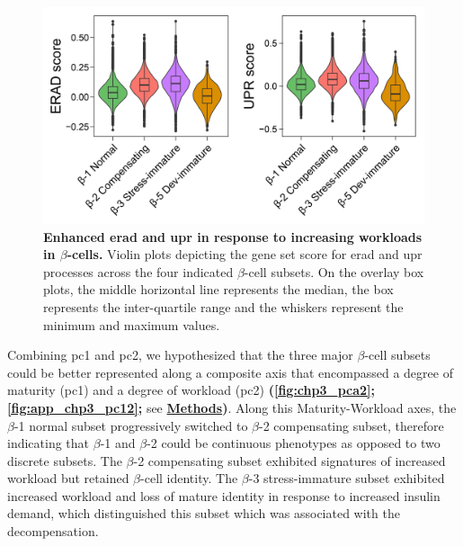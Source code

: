 \begin{figure}[t]
\centering
\includegraphics[width=\linewidth]{Chapter5/Fig/F3-22-01.png}
\caption[Enhanced  and  in response to increasing workloads in $\beta$-cells]{\textbf{Enhanced \gls{erad} and \gls{upr} in response to increasing workloads in $\beta$-cells.} Violin plots depicting the gene set score for \gls{erad} and \gls{upr} processes across the four indicated $\beta$-cell subsets. On the overlay box plots, the middle horizontal line represents the median, the box represents the inter-quartile range and the whiskers represent the minimum and maximum values.}
\label{fig:chp3_eradupr}
\end{figure}





\par Combining \gls{pc}1 and \gls{pc}2, we hypothesized that the three major $\beta$-cell subsets could be better represented along a composite axis that encompassed a degree of maturity (\gls{pc}1) and a degree of workload (\gls{pc}2) \textbf{(\autoref{fig:chp3_pca2}; \autoref{fig:app_chp3_pc12};} see \hyperref[subsubsec:met_chp3_pca]{\textbf{Methods}}\textbf{)}. Along this Maturity-Workload axes, the $\beta$-1 normal subset progressively switched to $\beta$-2 compensating subset, therefore indicating that $\beta$-1 and $\beta$-2 could be continuous phenotypes as opposed to two discrete subsets. The $\beta$-2 compensating subset exhibited signatures of increased workload but retained $\beta$-cell identity. The $\beta$-3 stress-immature subset exhibited increased workload and loss of mature identity in response to increased insulin demand, which distinguished this subset which was associated with the decompensation.\\

